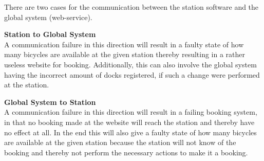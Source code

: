 \begin{description}[style=nextline]
There are two cases for the communication between the station software and the global system (web-service).

\textbf{Station to Global System}\\
A communication failure in this direction will result in a faulty state of how many bicycles are available at the given station thereby resulting in a rather useless website for booking.
Additionally, this can also involve the global system having the incorrect amount of docks registered, if such a change were performed at the station.

\textbf{Global System to Station}\\
A communication failure in this direction will result in a failing booking system, in that no booking made at the website will reach the station and thereby have no effect at all.
In the end this will also give a faulty state of how many bicycles are available at the given station because the station will not know of the booking and thereby not perform the necessary actions to make it a booking.

\end{description}

